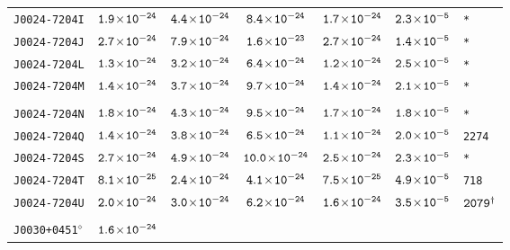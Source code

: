 \begin{longtable}{ l | c | c | c | c | c | l }
\scriptsize{\tt{J0024-7204I}} & \scriptsize{$\tt{1.9\!\times\!10^{-24}}$} & \scriptsize{$\tt{4.4\!\times\!10^{-24}}$} &
\scriptsize{$\tt{8.4\!\times\!10^{-24}}$} & \scriptsize{$\tt{1.7\!\times\!10^{-24}}$} & \scriptsize{$\tt{2.3\!\times\!10^{-5}}$} &
\scriptsize{\tt{*}} \\[-16pt] 
\scriptsize{\tt{J0024-7204J}} & \scriptsize{$\tt{2.7\!\times\!10^{-24}}$} & \scriptsize{$\tt{7.9\!\times\!10^{-24}}$} &
\scriptsize{$\tt{1.6\!\times\!10^{-23}}$} & \scriptsize{$\tt{2.7\!\times\!10^{-24}}$} & \scriptsize{$\tt{1.4\!\times\!10^{-5}}$} &
\scriptsize{\tt{*}} \\[-16pt] 
\scriptsize{\tt{J0024-7204L}} & \scriptsize{$\tt{1.3\!\times\!10^{-24}}$} & \scriptsize{$\tt{3.2\!\times\!10^{-24}}$} &
\scriptsize{$\tt{6.4\!\times\!10^{-24}}$} & \scriptsize{$\tt{1.2\!\times\!10^{-24}}$} & \scriptsize{$\tt{2.5\!\times\!10^{-5}}$} &
\scriptsize{\tt{*}} \\[-16pt] 
\scriptsize{\tt{J0024-7204M}} & \scriptsize{$\tt{1.4\!\times\!10^{-24}}$} & \scriptsize{$\tt{3.7\!\times\!10^{-24}}$} &
\scriptsize{$\tt{9.7\!\times\!10^{-24}}$} & \scriptsize{$\tt{1.4\!\times\!10^{-24}}$} & \scriptsize{$\tt{2.1\!\times\!10^{-5}}$} &
\scriptsize{\tt{*}} \\[-16pt] 
\\[-20pt] 
\scriptsize{\tt{J0024-7204N}} & \scriptsize{$\tt{1.8\!\times\!10^{-24}}$} & \scriptsize{$\tt{4.3\!\times\!10^{-24}}$} &
\scriptsize{$\tt{9.5\!\times\!10^{-24}}$} & \scriptsize{$\tt{1.7\!\times\!10^{-24}}$} & \scriptsize{$\tt{1.8\!\times\!10^{-5}}$} &
\scriptsize{\tt{*}} \\[-16pt] 
\scriptsize{\tt{J0024-7204Q}} & \scriptsize{$\tt{1.4\!\times\!10^{-24}}$} & \scriptsize{$\tt{3.8\!\times\!10^{-24}}$} &
\scriptsize{$\tt{6.5\!\times\!10^{-24}}$} &\scriptsize{$\tt{1.1\!\times\!10^{-24}}$} & \scriptsize{$\tt{2.0\!\times\!10^{-5}}$} &
\scriptsize{\tt{2274}} \\[-16pt] 
\scriptsize{\tt{J0024-7204S}} & \scriptsize{$\tt{2.7\!\times\!10^{-24}}$} & \scriptsize{$\tt{4.9\!\times\!10^{-24}}$} &
\scriptsize{$\tt{10.0\!\times\!10^{-24}}$} & \scriptsize{$\tt{2.5\!\times\!10^{-24}}$} & \scriptsize{$\tt{2.3\!\times\!10^{-5}}$}
& \scriptsize{\tt{*}} \\[-16pt] 
\scriptsize{\tt{J0024-7204T}} & \scriptsize{$\tt{8.1\!\times\!10^{-25}}$} & \scriptsize{$\tt{2.4\!\times\!10^{-24}}$} &
\scriptsize{$\tt{4.1\!\times\!10^{-24}}$} &\scriptsize{$\tt{7.5\!\times\!10^{-25}}$} & \scriptsize{$\tt{4.9\!\times\!10^{-5}}$} &
\scriptsize{\tt{718}} \\[-16pt] 
\scriptsize{\tt{J0024-7204U}} & \scriptsize{$\tt{2.0\!\times\!10^{-24}}$} & \scriptsize{$\tt{3.0\!\times\!10^{-24}}$} &
\scriptsize{$\tt{6.2\!\times\!10^{-24}}$} & \scriptsize{$\tt{1.6\!\times\!10^{-24}}$} & \scriptsize{$\tt{3.5\!\times\!10^{-5}}$} &
\scriptsize{$\tt{2079^{\dagger}}$} \\[-16pt] 
\\[-20pt] 
\scriptsize{\tt{J0030+0451}$^{\diamond}$} & \scriptsize{$\tt{1.6\!\times\!10^{-24}}$} &

\end{longtable}
